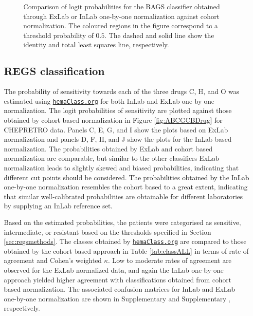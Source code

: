 \documentclass[10pt,letterpaper]{article}
\newcommand{\hemaClass}{\href{http://hemaClass.org}{\texttt{hemaClass.org}}}
\begin{document}
\begin{figure}
	\begin{center}
	\end{center}
	\caption{
		Comparison of logit probabilities for the BAGS classifier obtained through ExLab or InLab one-by-one normalization against cohort normalization.
		The coloured regions in the figure correspond to a threshold probability of $0.5$.
		The dashed and solid line show the identity and total least squares line, respectively.
	}
	\label{fig:Bagscorr}
\end{figure}
\newpage



\subsection*{REGS classification}
The probability of sensitivity towards each of the three drugs C, H, and O was estimated using \hemaClass{} for both InLab and ExLab one-by-one normalization.
The logit probabilities of sensitivity are plotted against those obtained by cohort based normalization in Figure \ref{fig:ABCGCBDrug} for CHEPRETRO data.
Panels C, E, G, and I show the plots based on ExLab normalization and panels D, F, H, and J show the plots for the InLab based normalization.
The probabilities obtained by ExLab and cohort based normalization are comparable, but similar to the other classifiers ExLab normalization leads to slightly skewed and biased probabilities, indicating that different cut points should be considered.
The probabilities obtained by the InLab one-by-one normalization resembles the cohort based to a great extent, indicating that similar well-calibrated probabilities are obtainable for different laboratories by supplying an InLab reference set.

Based on the estimated probabilities, the patients were categorised as sensitive, intermediate, or resistant based on the thresholds specified in Section \ref{sec:regsmethods}.
The classes obtained by \hemaClass{} are compared to those obtained by the cohort based approach in Table \ref{tab:classALL} in terms of rate of agreement and Cohen's weighted $\kappa$. Low to moderate rates of agreement are observed for the ExLab normalized data, and again the InLab one-by-one approach yielded higher agreement with classifications obtained from cohort based normalization. 
The associated confusion matrices for InLab and ExLab one-by-one normalization are shown in
Supplementary  and
Supplementary , respectively.
\end{document}
